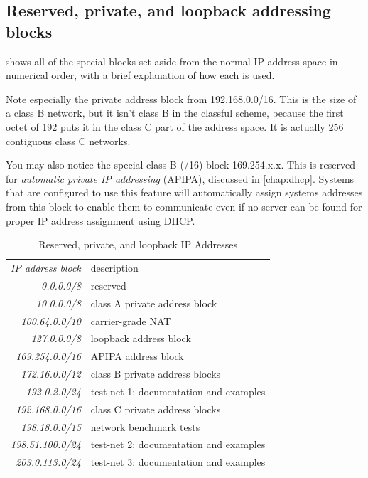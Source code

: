 \subsection{Reserved, private, and loopback addressing blocks}

 shows all of the special blocks set aside from the normal IP address space in numerical order, with a brief explanation of how each is used.

Note especially the private address block from 192.168.0.0/16.
This is the size of a class B network, but it isn't class B in the classful scheme, because the first octet of 192 puts it in the class C part of the address space.
It is actually 256 contiguous class C networks.

You may also notice the special class B (/16) block 169.254.x.x.
This is reserved for \emph{automatic private IP addressing} (APIPA), discussed in \vref{chap:dhcp}.
Systems that are configured to use this feature will automatically assign systems addresses from this block to enable them to communicate even if no server can be found for proper IP address assignment using DHCP.


\begin{table}
   \centering
   \begin{tabular}{rl}
   \textit{IP address block} & description \\[1ex]
   \textit{       0.0.0.0/8} & reserved \\
   \textit{      10.0.0.0/8} & class A private address block \\
   \textit{   100.64.0.0/10} & carrier-grade NAT \\
   \textit{     127.0.0.0/8} & loopback address block \\
   \textit{  169.254.0.0/16} & APIPA address block \\
   \textit{   172.16.0.0/12} & class B private address blocks \\
   \textit{    192.0.2.0/24} & test-net 1: documentation and examples \\
   \textit{  192.168.0.0/16} & class C private address blocks \\
   \textit{   198.18.0.0/15} & network benchmark tests \\
   \textit{ 198.51.100.0/24} & test-net 2: documentation and examples \\
   \textit{  203.0.113.0/24} & test-net 3: documentation and examples \\
   \end{tabular}
   \caption{Reserved, private, and loopback IP Addresses}
   \label{tab:reserved-ip-addresses}
\end{table}



